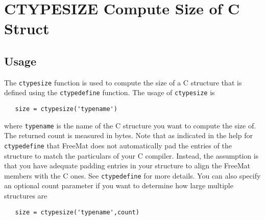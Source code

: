 \section{CTYPESIZE Compute Size of C Struct}

\subsection{Usage}

The \verb|ctypesize| function is used to compute the size of a C structure
that is defined using the \verb|ctypedefine| function.  The usage of 
\verb|ctypesize| is 
\begin{verbatim}
   size = ctypesize('typename')
\end{verbatim}
where \verb|typename| is the name of the C structure you want to compute
the size of.  The returned count is measured in bytes.  Note that as
indicated in the help for \verb|ctypedefine| that FreeMat does not 
automatically pad the entries of the structure to match the particulars
of your C compiler.  Instead, the assumption is that you have adequate
padding entries in your structure to align the FreeMat members with the
C ones.  See \verb|ctypedefine| for more details.  You can also specify
an optional count parameter if you want to determine how large multiple
structures are
\begin{verbatim}
   size = ctypesize('typename',count)
\end{verbatim}
